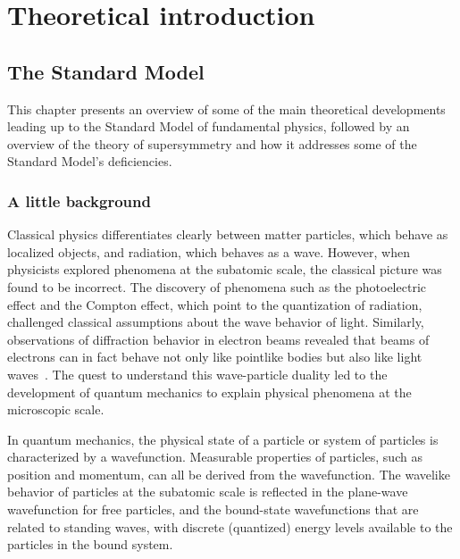 \chapter{Theoretical introduction\label{sec:intro}}



\section{The Standard Model\label{sec:SM}}

This chapter presents an overview of some of the main theoretical developments leading up to the Standard Model of fundamental physics, followed by an overview of the theory of supersymmetry and how it addresses some of the Standard Model's deficiencies.

\subsection{A little background\label{sec:SM-history}}

Classical physics differentiates clearly between matter particles, which behave as localized objects, and radiation, which behaves as a wave. However, when physicists explored phenomena at the subatomic scale, the classical picture was found to be incorrect. The discovery of phenomena such as the photoelectric effect and the Compton effect, which point to the quantization of radiation, challenged classical assumptions about the wave behavior of light. Similarly, observations of diffraction behavior in electron beams revealed that beams of electrons can in fact behave not only like pointlike bodies but also like light waves~\cite{MessiahPhysics}. The quest to understand this wave-particle duality led to the development of quantum mechanics to explain physical phenomena at the microscopic scale.

In quantum mechanics, the physical state of a particle or system of particles is characterized by a wavefunction. Measurable properties of particles, such as position and momentum, can all be derived from the wavefunction. The wavelike behavior of particles at the subatomic scale is reflected in the plane-wave wavefunction for free particles, and the bound-state wavefunctions that are related to standing waves, with discrete (quantized) energy levels available to the particles in the bound system.

